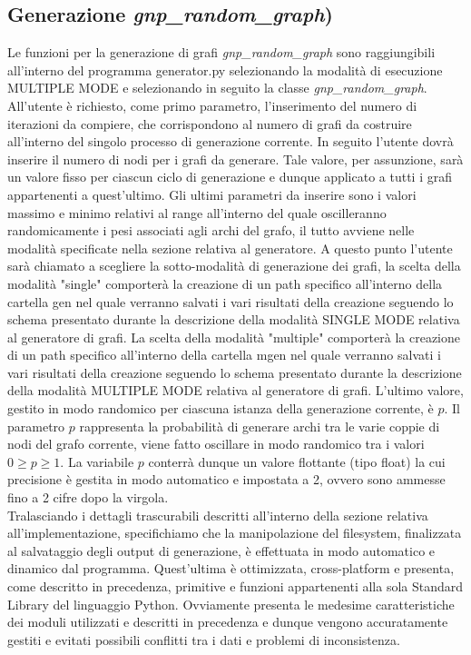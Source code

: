 \subsection{Generazione \textit{gnp\_random\_graph})}
\justify
Le funzioni per la generazione di grafi \textit{gnp\_random\_graph} sono raggiungibili all'interno del programma generator.py selezionando la modalità di esecuzione MULTIPLE MODE e selezionando in seguito la classe \textit{gnp\_random\_graph}. All'utente è richiesto, come primo parametro, l'inserimento del numero di iterazioni da compiere, che corrispondono al numero di grafi da costruire all'interno del singolo processo di generazione corrente. In seguito l'utente dovrà inserire il numero di nodi per i grafi da generare. Tale valore, per assunzione, sarà un valore fisso per ciascun ciclo di generazione e dunque applicato a tutti i grafi appartenenti a quest'ultimo. Gli ultimi parametri da inserire sono i valori massimo e minimo relativi al range all'interno del quale oscilleranno randomicamente i pesi associati agli archi del grafo, il tutto avviene nelle modalità specificate nella sezione relativa al generatore. A questo punto l'utente sarà chiamato a scegliere la sotto-modalità di generazione dei grafi, la scelta della modalità "single" comporterà la creazione di un path specifico all'interno della cartella gen nel quale verranno salvati i vari risultati della creazione seguendo lo schema presentato durante la descrizione della modalità SINGLE MODE relativa al generatore di grafi. La scelta della modalità "multiple" comporterà la creazione di un path specifico all'interno della cartella mgen nel quale verranno salvati i vari risultati della creazione seguendo lo schema presentato durante la descrizione della modalità MULTIPLE MODE relativa al generatore di grafi. L'ultimo valore, gestito in modo randomico per ciascuna istanza della generazione corrente, è $p$. Il parametro $p$ rappresenta la probabilità di generare archi tra le varie coppie di nodi del grafo corrente, viene fatto oscillare in modo randomico tra i valori \(0 \geq p \geq 1\). La variabile $p$ conterrà dunque un valore flottante (tipo float) la cui precisione è gestita in modo automatico e impostata a 2, ovvero sono ammesse fino a 2 cifre dopo la virgola.\\
Tralasciando i dettagli trascurabili descritti all'interno della sezione relativa all'implementazione, specifichiamo che la manipolazione del filesystem, finalizzata al salvataggio degli output di generazione, è effettuata in modo automatico e dinamico dal programma. Quest'ultima è ottimizzata, cross-platform e presenta, come descritto in precedenza, primitive e funzioni appartenenti alla sola Standard Library del linguaggio Python. Ovviamente presenta le medesime caratteristiche dei moduli utilizzati e descritti in precedenza e dunque vengono accuratamente gestiti e evitati possibili conflitti tra i dati e problemi di inconsistenza.\\

